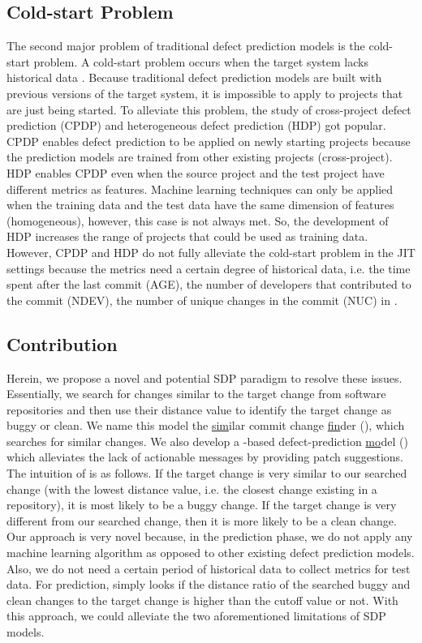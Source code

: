 \subsection{Cold-start Problem}
The second major problem of traditional defect prediction models is the cold-start problem.
A cold-start problem occurs when the target system lacks historical data \cite{schein2002methods}. 
Because traditional defect prediction models are built with previous versions of the target system, it is impossible to apply to projects that are just being started.
To alleviate this problem, the study of cross-project defect prediction (CPDP) and heterogeneous defect prediction (HDP) got popular.
CPDP enables defect prediction to be applied on newly starting projects because the prediction models are trained from other existing projects (cross-project).
HDP enables CPDP even when the source project and the test project have different metrics as features.
Machine learning techniques can only be applied when the training data and the test data have the same dimension of features (homogeneous), however, this case is not always met.
So, the development of HDP increases the range of projects that could be used as training data.
However, CPDP and HDP do not fully alleviate the cold-start problem in the JIT settings because the metrics need a certain degree of historical data, i.e. the time spent after the last commit (AGE), the number of developers that contributed to the commit (NDEV), the number of unique changes in the commit (NUC) in \cite{kamei2012large}.

\subsection{Contribution}
Herein, we propose a novel and potential SDP paradigm to resolve these issues.
Essentially, we search for changes similar to the target change from software repositories and then use their distance value to identify the target change as buggy or clean.
We name this model the \underline{sim}ilar commit change \underline{fin}der ({\simfin}), which searches for similar changes.
We also develop a \underline{\simfin}-based defect-prediction \underline{mo}del ({\simfinmo}) which alleviates the lack of actionable messages by providing patch suggestions.
The intuition of {\simfin} is as follows.
If the target change is very similar to our searched change (with the lowest distance value, i.e. the closest change existing in a repository), it is most likely to be a buggy change.
If the target change is very different from our searched change, then it is more likely to be a clean change.
Our approach is very novel because, in the prediction phase, we do not apply any machine learning algorithm as opposed to other existing defect prediction models.
Also, we do not need a certain period of historical data to collect metrics for test data.
For prediction, {\simfinmo} simply looks if the distance ratio of the searched buggy and clean changes to the target change is higher than the cutoff value or not.
With this approach, we could alleviate the two aforementioned limitations of SDP models.

